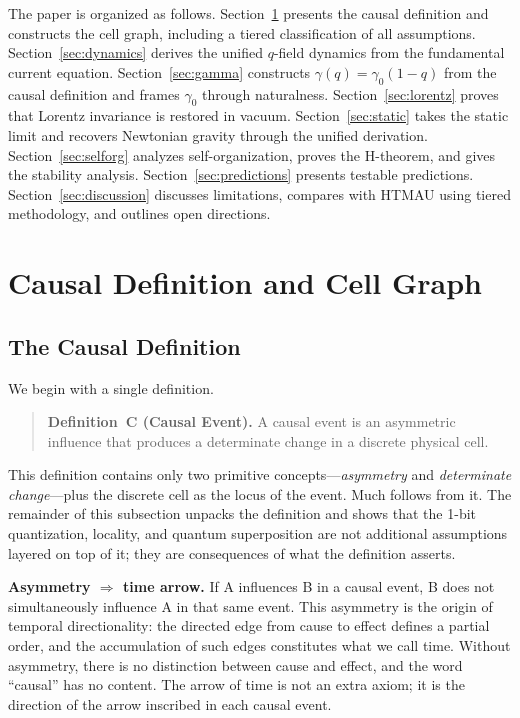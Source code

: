 \documentclass[aps,prd,twocolumn,showpacs,superscriptaddress,preprintnumbers]{revtex4-2}
\begin{document}
The paper is organized as follows.
Section~\ref{sec:axioms} presents the causal definition and constructs the cell graph, including a tiered classification of all assumptions.
Section~\ref{sec:dynamics} derives the unified $q$-field dynamics from the fundamental current equation.
Section~\ref{sec:gamma} constructs $\gamma(q)=\gamma_0(1-q)$ from the causal definition and frames $\gamma_0$ through naturalness.
Section~\ref{sec:lorentz} proves that Lorentz invariance is restored in vacuum.
Section~\ref{sec:static} takes the static limit and recovers Newtonian gravity through the unified derivation.
Section~\ref{sec:selforg} analyzes self-organization, proves the H-theorem, and gives the stability analysis.
Section~\ref{sec:predictions} presents testable predictions.
Section~\ref{sec:discussion} discusses limitations, compares with HTMAU using tiered methodology, and outlines open directions.

\section{Causal Definition and Cell Graph}
\label{sec:axioms}

\subsection{The Causal Definition}
\label{sec:causal_def}

We begin with a single definition.

\begin{quote}
\textbf{Definition~C (Causal Event).} A causal event is an asymmetric influence that produces a determinate change in a discrete physical cell.
\end{quote}

This definition contains only two primitive concepts---\emph{asymmetry} and \emph{determinate change}---plus the discrete cell as the locus of the event. Much follows from it. The remainder of this subsection unpacks the definition and shows that the 1-bit quantization, locality, and quantum superposition are not additional assumptions layered on top of it; they are consequences of what the definition asserts.

\textbf{Asymmetry $\Rightarrow$ time arrow.}
If A influences B in a causal event, B does not simultaneously influence A in that same event. This asymmetry is the origin of temporal directionality: the directed edge from cause to effect defines a partial order, and the accumulation of such edges constitutes what we call time. Without asymmetry, there is no distinction between cause and effect, and the word ``causal'' has no content. The arrow of time is not an extra axiom; it is the direction of the arrow inscribed in each causal event.
\end{document}
